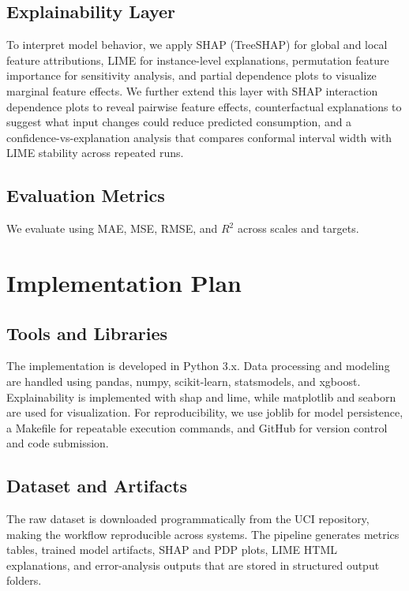 \documentclass[conference]{IEEEtran}
\begin{document}
\subsection{Explainability Layer}
To interpret model behavior, we apply SHAP (TreeSHAP) for global and local feature attributions, LIME for instance-level explanations, permutation feature importance for sensitivity analysis, and partial dependence plots to visualize marginal feature effects. We further extend this layer with SHAP interaction dependence plots to reveal pairwise feature effects, counterfactual explanations to suggest what input changes could reduce predicted consumption, and a confidence-vs-explanation analysis that compares conformal interval width with LIME stability across repeated runs.

\subsection{Evaluation Metrics}
We evaluate using MAE, MSE, RMSE, and $R^2$ across scales and targets.

\section{Implementation Plan}

\subsection{Tools and Libraries}
The implementation is developed in Python 3.x. Data processing and modeling are handled using pandas, numpy, scikit-learn, statsmodels, and xgboost. Explainability is implemented with shap and lime, while matplotlib and seaborn are used for visualization. For reproducibility, we use joblib for model persistence, a Makefile for repeatable execution commands, and GitHub for version control and code submission.

\subsection{Dataset and Artifacts}
The raw dataset is downloaded programmatically from the UCI repository, making the workflow reproducible across systems. The pipeline generates metrics tables, trained model artifacts, SHAP and PDP plots, LIME HTML explanations, and error-analysis outputs that are stored in structured output folders.
\end{document}
